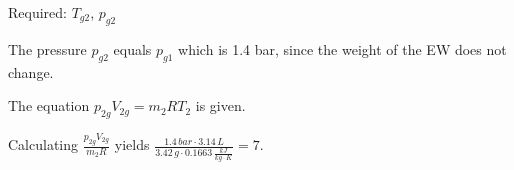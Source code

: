 Required: \( T_{g2} \), \( p_{g2} \)

The pressure \( p_{g2} \) equals \( p_{g1} \) which is 1.4 bar, since the weight of the EW does not change.

The equation \( p_{2g} V_{2g} = m_2 R T_2 \) is given.

Calculating \( \frac{p_{2g} V_{2g}}{m_2 R} \) yields \( \frac{1.4 \, bar \cdot 3.14 \, L}{3.42 \, g \cdot 0.1663 \, \frac{kJ}{kg \cdot K}} = 7 \).